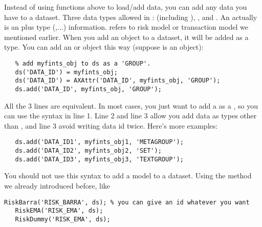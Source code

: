Instead of using functions above to load/add data, you can add any data you have to a dataset.
Three data types allowed in :  (including ), ,
and .
An  actually is an  plus type (,...) information.
 refers to risk model or transaction model we mentioned earlier.
When you add an  object to a dataset, it will be added as a  type.
You can add an  or  object this way (suppose  is an  object):

\begin{lstlisting}
   % add myfints_obj to ds as a 'GROUP'. 
   ds('DATA_ID') = myfints_obj;   
   ds('DATA_ID') = AXAttr('DATA_ID', myfints_obj, 'GROUP');
   ds.add('DATA_ID', myfints_obj, 'GROUP');
\end{lstlisting}

All the 3 lines are equivalent. In most cases, you just want to add a \myfints{}
as a , so you can use the syntax in line 1.
Line 2 and line 3 allow you add data as types other than ,
and line 3 avoid writing data id twice.
Here's more examples:

\begin{lstlisting}
   ds.add('DATA_ID1', myfints_obj1, 'METAGROUP');
   ds.add('DATA_ID2', myfints_obj2, 'SET');
   ds.add('DATA_ID3', myfints_obj3, 'TEXTGROUP');
\end{lstlisting}

You should not use this syntax to add a model to a dataset.
Using the method we already introduced before, like
\begin{lstlisting}[numbers=none]
   RiskBarra('RISK_BARRA', ds); % you can give an id whatever you want
   RiskEMA('RISK_EMA', ds);
   RiskDummy('RISK_EMA', ds);
\end{lstlisting}

